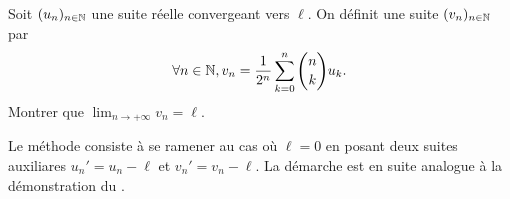 \begin{exercice}
    Soit $(u_n)_{n \in \mathbb{N}}$ une suite réelle convergeant vers $\ell$. On définit une suite $(v_n)_{n \in \mathbb{N}}$ par 
    $$\forall n \in \mathbb{N}, v_n = \frac{1}{2^n} \sum_{k=0}^{n} \binom{n}{k} u_k.$$
    Montrer que $\displaystyle \lim_{n \rightarrow + \infty} v_n = \ell$.
\end{exercice}

\begin{elem_sol}
    Le méthode consiste à se ramener au cas où $\ell = 0$ en posant deux suites auxiliares $u_n'=u_n - \ell$ et $v_n' = v_n - \ell$. La démarche est en suite analogue à la démonstration du .
\end{elem_sol}
